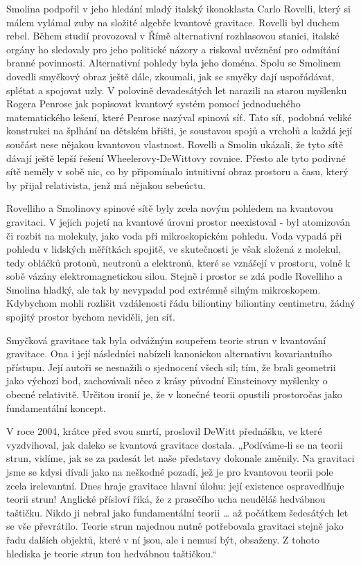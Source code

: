   Smolina podpořil v jeho hledání mladý italský ikonoklasta Carlo Rovelli, který si málem vylámal
  zuby na složité algebře kvantové gravitace. Rovelli byl duchem rebel. Během studií provozoval v
  Římě alternativní rozhlasovou stanici, italské orgány ho sledovaly pro jeho politické názory a
  riskoval uvěznění pro odmítání branné povinnosti. Alternativní pohledy byla jeho doména. Spolu se
  Smolinem dovedli smyčkový obraz ještě dále, zkoumali, jak se smyčky dají uspořádávat, splétat a
  spojovat uzly. V polovině devadesátých let narazili na starou myšlenku Rogera Penrose jak
  popisovat kvantový systém pomocí jednoduchého matematického lešení, které Penrose nazýval spinová
  síť. Tato síť, podobná veliké konstrukci na šplhání na dětském hřišti, je soustavou spojů a
  vrcholů a každá její součást nese nějakou kvantovou vlastnost. Rovelli a Smolin ukázali, že tyto
  sítě dávají ještě lepší řešení Wheelerovy-DeWittovy rovnice. Přesto ale tyto podivné sítě neměly v
  sobě nic, co by připomínalo intuitivní obraz prostoru a času, který by přijal relativista, jenž má
  nějakou sebeúctu. 
  
  Rovelliho a Smolinovy spinové sítě byly zcela novým pohledem na kvantovou gravitaci. V jejich
  pojetí na kvantové úrovni prostor neexistoval - byl atomizován či rozbit na molekuly, jako voda
  při mikroskopickém pohledu. Voda vypadá při pohledu v lidských měřítkách spojitě, ve skutečnosti
  je však složená z molekul, tedy obláčků protonů, neutronů a elektronů, které se vznášejí v
  prostoru, volně k sobě vázány elektromagnetickou silou. Stejně i prostor se zdá podle Rovelliho a
  Smolina hladký, ale tak by nevypadal pod extrémně silným mikroskopem. Kdybychom mohli rozlišit
  vzdálenosti řádu biliontiny biliontiny centimetru, žádný spojitý prostor bychom neviděli, jen síť.
  
  Smyčková gravitace tak byla odvážným soupeřem teorie strun v kvantování gravitace. Ona i její
  následníci nabízeli kanonickou alternativu kovariantního přístupu. Její autoři se nesnažili o
  sjednocení všech sil; tím, že brali geometrii jako výchozí bod, zachovávali něco z krásy původní
  Einsteinovy myšlenky o obecné relativitě. Určitou ironií je, že v konečné teorii opustili
  prostoročas jako fundamentální koncept. 
  
  V roce 2004, krátce před svou smrtí, proslovil DeWitt přednášku, ve které vyzdvihoval, jak daleko
  se kvantová gravitace dostala. „Podíváme-li se na teorii strun, vidíme, jak se za padesát let naše
  představy dokonale změnily. Na gravitaci jsme se kdysi dívali jako na neškodné pozadí, jež je pro
  kvantovou teorii pole zcela irelevantní. Dnes hraje gravitace hlavní úlohu: její existence
  ospravedlňuje teorii strun! Anglické přísloví říká, že z prasečího ucha neuděláš hedvábnou
  taštičku. Nikdo ji nebral jako fundamentální teorii … až počátkem šedesátých let se vše
  převrátilo. Teorie strun najednou nutně potřebovala gravitaci stejně jako řadu dalších objektů,
  které v ní jsou, ale i nemusí být, obsaženy. Z tohoto hlediska je teorie strun tou hedvábnou
  taštičkou.“
  
